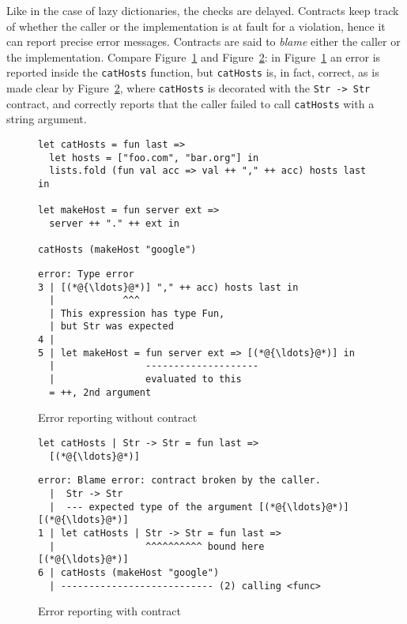 \documentclass[sigplan,10pt,review,anonymous]{acmart}
\newcommand{\nickel}[1]{\lstinline[language=nickel]{#1}}
\begin{document}
Like in the case of lazy dictionaries, the checks are delayed.
Contracts keep track of whether the caller or the implementation is
at fault for a violation, hence it can report precise error
messages. Contracts are said to \emph{blame} either the caller or the
implementation. Compare Figure~\ref{fig:contract-reporting-wo} and
Figure~\ref{fig:contract-reporting-w}: in
Figure~\ref{fig:contract-reporting-wo} an error is reported inside the
\nickel{catHosts} function, but \nickel{catHosts} is, in fact,
correct, as is made clear by Figure~\ref{fig:contract-reporting-w},
where \nickel{catHosts} is decorated with the \nickel{Str -> Str}
contract, and correctly reports that the caller failed to call
\nickel{catHosts} with a string argument.

\begin{figure*}
  \centering
  \begin{subfigure}[b]{0.48\linewidth}
    \begin{lstlisting}[language=nickel]
let catHosts = fun last =>
  let hosts = ["foo.com", "bar.org"] in
  lists.fold (fun val acc => val ++ "," ++ acc) hosts last in

let makeHost = fun server ext =>
  server ++ "." ++ ext in

catHosts (makeHost "google")
\end{lstlisting}

    \begin{lstlisting}[frame=none,numbers=none, basicstyle=\footnotesize\ttfamily]
error: Type error
3 | [(*@{\ldots}@*)] "," ++ acc) hosts last in
  |            ^^^
  | This expression has type Fun,
  | but Str was expected
4 |
5 | let makeHost = fun server ext => [(*@{\ldots}@*)] in
  |                --------------------
  |                evaluated to this
  = ++, 2nd argument
\end{lstlisting}
    \caption{Error reporting without contract}
    \label{fig:contract-reporting-wo}
  \end{subfigure}
  \hfill
  \begin{subfigure}[b]{0.48\linewidth}
    \begin{lstlisting}[language=nickel]
let catHosts | Str -> Str = fun last =>
  [(*@{\ldots}@*)]
\end{lstlisting}
\vspace{10ex}
    \begin{lstlisting}[frame=none,numbers=none, basicstyle=\footnotesize\ttfamily]
error: Blame error: contract broken by the caller.
  |  Str -> Str
  |  --- expected type of the argument [(*@{\ldots}@*)]
[(*@{\ldots}@*)]
1 | let catHosts | Str -> Str = fun last =>
  |                ^^^^^^^^^^ bound here
[(*@{\ldots}@*)]
6 | catHosts (makeHost "google")
  | --------------------------- (2) calling <func>
    \end{lstlisting}
    \caption{Error reporting with contract}
    \label{fig:contract-reporting-w}
  \end{subfigure}
  \caption{Contracts improve error messages}
\end{figure*}
\end{document}
